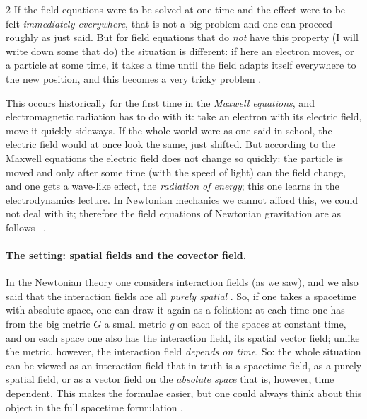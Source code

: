 \begin{paracol}{2}
If the field equations were to be solved at one time and the effect were to be felt \emph{immediately everywhere}, that is not a big problem and one can proceed roughly as just said. But for field equations that do \emph{not} have this property (I will write down some that do) the situation is different: if here an electron moves, or a particle at some time, it takes a time until the field adapts itself everywhere to the new position, and this becomes a very tricky problem .

\begin{aside}
This occurs historically for the first time in the \emph{Maxwell equations}, and electromagnetic radiation has to do with it: take an electron with its electric field, move it quickly sideways. If the whole world were as one said in school, the electric field would at once look the same, just shifted. But according to the Maxwell equations the electric field does not change so quickly: the particle is moved
and only after some time (with the speed of light) can the field change, and one gets a wave-like effect, the \emph{radiation of energy}; this one learns in the electrodynamics lecture. In Newtonian mechanics we cannot afford this, we could not deal with it; therefore the field equations of Newtonian gravitation are as follows --.
\end{aside}

\paragraph{The setting: spatial fields and the covector field.} In the Newtonian theory one considers interaction fields (as we saw), and we also said that the interaction fields are all \emph{purely spatial} . So, if one takes a spacetime with absolute space, one can draw it again as a foliation: at each time one has from the big metric $G$ a small metric $g$
on each of the spaces at constant time, and on each space one also has the interaction field, its spatial vector field; unlike the metric, however, the interaction field \emph{depends on time}. So: the whole situation can be viewed as an interaction field that in truth is a spacetime field, as a purely spatial field, or as a vector field on the \emph{absolute space} that is, however, time dependent.
This makes the formulae easier, but one could always think about this object in the full spacetime formulation .


\end{paracol}
